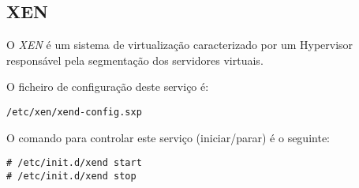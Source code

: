 \subsection{XEN}

O \emph{XEN} é um sistema de virtualização caracterizado por um Hypervisor responsável pela segmentação dos servidores virtuais.

O ficheiro de configuração deste serviço é:

\begin{Verbatim}[commandchars=\\\{\}]
/etc/xen/xend-config.sxp
\end{Verbatim}

O comando para controlar este serviço (iniciar/parar) é o seguinte:

\begin{Verbatim}[commandchars=\\\{\}]
# /etc/init.d/xend start
# /etc/init.d/xend stop
\end{Verbatim}

